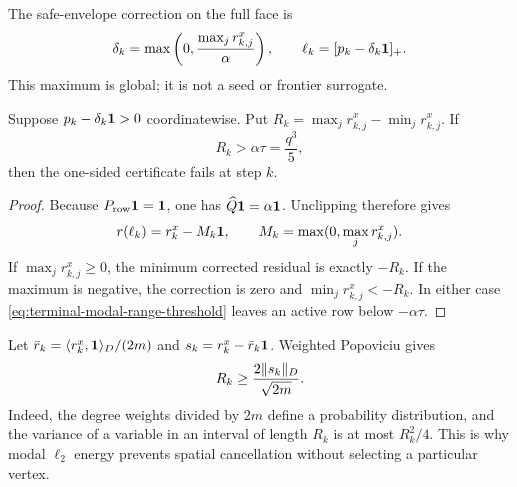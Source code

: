 The safe-envelope correction on the full face is
\begin{equation}
 \delta_k=\max\left(0,\frac{\max_j r_{k,j}^x}{\alpha}\right),
 \qquad
 \ell_k=[p_k-\delta_k\mathbf{1}]_+.
 \label{eq:terminal-modal-correction}
\end{equation}
This maximum is global; it is not a seed or frontier surrogate.

\begin{lemma}
\label{lem:terminal-modal-range}
Suppose $p_k-\delta_k\mathbf{1}>0$ coordinatewise.  Put
$R_k=\max_jr_{k,j}^x-\min_jr_{k,j}^x$.  If
\begin{equation}
 R_k>\alpha\tau=\frac{q^3}{5},
 \label{eq:terminal-modal-range-threshold}
\end{equation}
then the one-sided certificate fails at step $k$.
\end{lemma}

\begin{proof}
Because $P_{\rm row}\mathbf{1}=\mathbf{1}$, one has $\widehat Q\mathbf{1}=\alpha\mathbf{1}$.
Unclipping therefore gives
\[
 r(\ell_k)=r_k^x-M_k\mathbf{1},
 \qquad M_k=\max(0,\max_jr_{k,j}^x).
\]
If $\max_jr_{k,j}^x\ge0$, the minimum corrected residual is exactly $-R_k$.
If the maximum is negative, the correction is zero and
$\min_jr_{k,j}^x< -R_k$.  In either case
\eqref{eq:terminal-modal-range-threshold} leaves an active row below
$-\alpha\tau$.
\end{proof}

Let $\bar r_k=\langle r_k^x,\mathbf{1}\rangle_D/(2m)$ and
$s_k=r_k^x-\bar r_k\mathbf{1}$.  Weighted Popoviciu gives
\begin{equation}
 R_k\ge\frac{2\lVert s_k\rVert_D}{\sqrt{2m}}.
 \label{eq:terminal-modal-popoviciu}
\end{equation}
Indeed, the degree weights divided by $2m$ define a probability distribution,
and the variance of a variable in an interval of length $R_k$ is at most
$R_k^2/4$.  This is why modal $\ell_2$ energy prevents spatial cancellation
without selecting a particular vertex.
